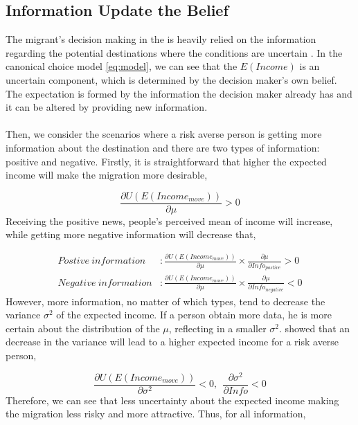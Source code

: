 \documentclass{article}
\begin{document}
\subsection{Information Update the Belief}
The migrant's decision making in the is heavily relied on the information regarding the potential destinations where the conditions are uncertain \parencite{Allen:1979it}. In the canonical choice model \eqref{eq:model}, we can see that the $E(Income)$ is an uncertain component, which is determined by the decision maker's own belief. The expectation is formed by the information the decision maker already has and it can be altered by providing new information.
\\~\\
Then, we consider the scenarios where a risk averse person is getting more information about the destination and there are two types of information: positive and negative. Firstly, it is straightforward that higher the expected income will make the migration more desirable,

\begin{equation}
    \frac{\partial U(E(Income_{move}))}{\partial \mu} > 0
\end{equation}
Receiving the positive news, people's perceived mean of income will increase, while getting more negative information will decrease that,

\begin{equation}
    \begin{aligned}\label{eq:1}
    Postive\ information&:\frac{\partial U(E(Income_{move}))}{\partial \mu}\times\frac{\partial \mu}{\partial Info_{postive}} > 0\\
    Negative\ information&:\frac{\partial U(E(Income_{move}))}{\partial \mu}\times\frac{\partial \mu}{\partial Info_{negative}} < 0
    \end{aligned}
\end{equation}
However, more information, no matter of which types, tend to decrease the variance $\sigma^2$ of the expected income. If a person obtain more data, he is more certain about the distribution of the $\mu$, reflecting in a smaller $\sigma^2$. \textcite{Stiglitz:1970sj} showed that an decrease in the variance will lead to a higher expected income for a risk averse person,

\begin{equation}
    \frac{\partial U(E(Income_{move}))}{\partial \sigma^2} < 0,\ \ 
    \frac{\partial \sigma^2}{\partial Info} < 0
\end{equation}
 Therefore, we can see that less uncertainty about the expected income making the migration less risky and more attractive. Thus, for all information,
\end{document}
